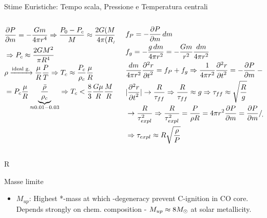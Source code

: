 \begin{frame}{Stime Euristiche: Tempo scala, Pressione e Temperatura centrali}
    \begin{columns}[T]
        \begin{column}{0.5\textwidth}
            \begin{align*}
                &\PDy{m}{P}=-\frac{Gm}{4\pi r^4}\Rightarrow \frac{P_0-P_c}{M}\approx \frac{2G(M/2)^2}{4\pi(R/2)^4}\\
                &\Rightarrow P_c\approx \frac{2GM^2}{\pi R^4}\\
                &\rho\xrightarrow{\text{ideal g.}}\frac{\mu}{R}\frac{P}{T}\Rightarrow T_c\approx \frac{P_c}{\rho_c}\frac{\mu}{R}\\
                &=P_c\frac{\mu}{R}\underbrace{\frac{\bar{\rho}}{\rho_c}}_{\approx0.01-0.03}\Rightarrow T_c<\frac{8}{3}\frac{G\mu}{R}\frac{M}{R}
            \end{align*}
        \end{column}
        \begin{column}{0.5\textwidth}
            \begin{align*}
                &f_P=-\PDy{m}{P}\,dm\\
                &f_g=-\frac{g\,dm}{4\pi r^2}=-\frac{Gm}{r^2}\frac{dm}{4\pi r^2}\\
                &\frac{dm}{4\pi r^2}\PtwoDy{t}{r}=f_P+f_g\Rightarrow \frac{1}{4\pi r^2}\PtwoDy{t}{r}=-\PDy{m}{P}-\frac{Gm}{4\pi r^4}\\
                &|\PtwoDy{t}{r}|\to \frac{R}{\tau_{ff}}\Rightarrow \frac{R}{\tau_{ff}}\approx g\Rightarrow\tau_{ff}\approx\sqrt{\frac{R}{g}}\\
                &\to \frac{R}{\tau_{expl}^2}\Rightarrow \frac{R}{\tau_{expl}^2}=\frac{P}{\rho R}=4\pi r^2\PDy{m}{P}=\PDy{m}{P}/\rho\\
                &\Rightarrow\tau_{expl}\approx R\sqrt{\frac{\rho}{P}}
            \end{align*}
        \end{column}
    \end{columns}
R\end{frame}

\begin{frame}{Masse limite}
    \begin{itemize}
        \item $M_{up}$: Highest *-mass at which \Pelectron-degeneracy prevent C-ignition in CO core. Depends strongly on chem. composition - $M_{up}\approx8\msun{}$ at solar metallicity.
    \end{itemize}
\end{frame}

